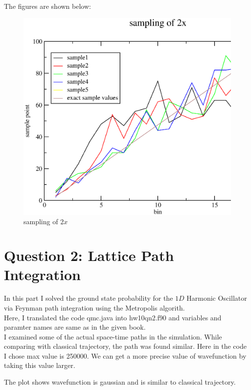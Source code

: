 \documentclass[11pt,a4paper,english]{article}
\begin{document}
	    The figures are shown below:\\
	\begin{figure}[h!]
	\centering
	\includegraphics [scale=0.6]{figures/hw10qn1a.eps}
	\caption{sampling of $2x$ }
	\end{figure}
	\clearpage
\section{Question 2: Lattice Path Integration }

	In this part I solved the ground state probability for the $1D$ Harmonic Oscillator via
	Feynman path integration using the Metropolis algorith.\\
	Here, I translated the code qmc.java into hw10qn2.f90 and variables and paramter names are same
	as in the given book.\\
	I examined some of the actual space-time paths in the simulation.
	While comparing with classical trajectory, the path was found similar.
	Here in the code I chose max value is 250000.
	We can get a more precise value of wavefunction by taking this value larger.
	
	The plot shows wavefunction is gaussian and is similar to classical trajectory.	
		
\end{document}
